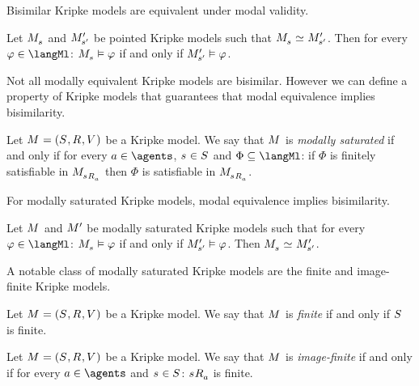 \pagebreak

Bisimilar Kripke models are equivalent under modal validity.

\begin{proposition}\label{modal-bisimulation-invariance}
Let $\kPModel{\kStateS}$ and ${M^{\prime}_{{s}^{\prime}}}$ be pointed Kripke models such that $\kPModel{\kStateS} \bisimilar \kPModelP{\kStateSP}$.
Then for every $\phi \in \langMl$:
$\kPModel{\kStateS} \entails \phi$ if and only if ${M^{\prime}_{{s}^{\prime}}} \vDash \varphi$.
\end{proposition}

Not all modally equivalent Kripke models are bisimilar.
However we can define a property of Kripke models that guarantees that modal equivalence implies bisimilarity.

\begin{definition}
Let $\kModelAndTuple$ be a Kripke model.
We say that $\kModel$ is {\em modally saturated} if and only if for every $\agentA \in \agents$, $\kStateS \in \kStates$ and $\Phi \subseteq \langMl$: if $\Phi$ is finitely satisfiable in $\kPModel{\kSuccessorsA{\kStateS}}$ then $\Phi$ is satisfiable in $\kPModel{\kSuccessorsA{\kStateS}}$.
\end{definition}

For modally saturated Kripke models, modal equivalence implies bisimilarity.

\begin{proposition}\label{modal-hennessy-milner}
Let $\kModel$ and ${M^{\prime}_{}}$ be modally saturated Kripke models such that for every $\phi \in \langMl$: $\kPModel{\kStateS} \entails \phi$ if and only if ${M^{\prime}_{{s}^{\prime}}} \vDash \varphi$.
Then $\kPModel{\kStateS} \bisimilar \kPModelP{\kStateSP}$.
\end{proposition}

A notable class of modally saturated Kripke models are the finite and image-finite Kripke models.

\begin{definition}
Let $\kModelAndTuple$ be a Kripke model.
We say that $\kModel$ is {\em finite} if and only if $\kStates$ is finite.
\end{definition}

\begin{definition}
Let $\kModelAndTuple$ be a Kripke model.
We say that $\kModel$ is {\em image-finite} if and only if for every $\agentA \in \agents$ and $\kStateS \in \kStates$: $\kSuccessorsA{\kStateS}$ is finite.
\end{definition}

